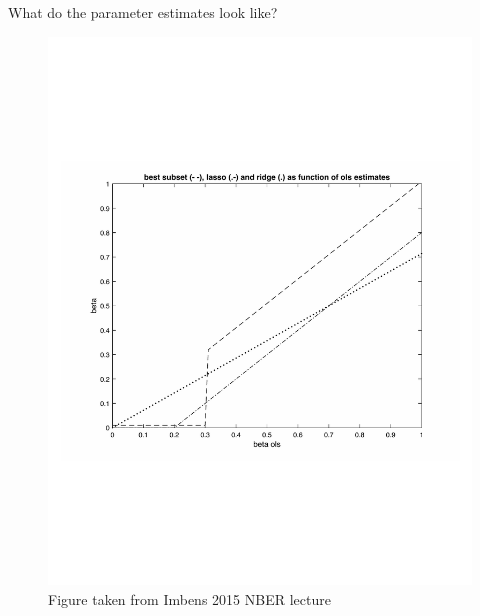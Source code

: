 \documentclass[mathserif]{beamer}
\begin{document}
\begin{frame}{What do the parameter estimates look like?}

\begin{figure}
\includegraphics[scale=0.5]{lasso-ridge-subset-vs-ols}
\caption*{\tiny Figure taken from Imbens 2015 NBER lecture}
\end{figure}

\end{frame}
\end{document}
